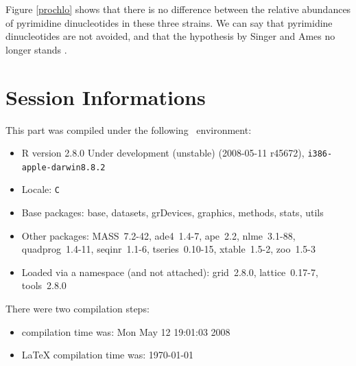 \documentclass{article}
\begin{document}
\begin{figure}
\centering{}
\end{figure}

Figure \ref{prochlo} shows that there is no difference between the
relative abundances of pyrimidine dinucleotides in these three
strains. We can say that pyrimidine dinucleotides are not avoided, and
that the hypothesis by Singer and Ames \cite{Singer} no longer stands
\cite{UV}.


\section*{Session Informations}

This part was compiled under the following \Rlogo{}~environment:

\begin{itemize}
  \item R version 2.8.0 Under development (unstable) (2008-05-11 r45672), \verb|i386-apple-darwin8.8.2|
  \item Locale: \verb|C|
  \item Base packages: base, datasets, grDevices, graphics, methods,
    stats, utils
  \item Other packages: MASS~7.2-42, ade4~1.4-7, ape~2.2,
    nlme~3.1-88, quadprog~1.4-11, seqinr~1.1-6, tseries~0.10-15,
    xtable~1.5-2, zoo~1.5-3
  \item Loaded via a namespace (and not attached): grid~2.8.0,
    lattice~0.17-7, tools~2.8.0
\end{itemize}
There were two compilation steps:

\begin{itemize}
  \item \Rlogo{} compilation time was: Mon May 12 19:01:03 2008
  \item \LaTeX{} compilation time was: \today
\end{itemize}



\clearpage
{}


\end{document}
